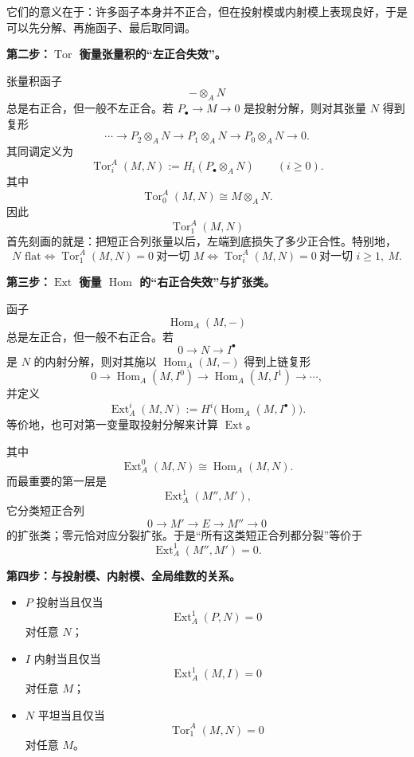 \documentclass[a4paper]{ctexart}
\theoremstyle{definition}
\theoremstyle{analysis}
\theoremstyle{plain}
\begin{document}
它们的意义在于：许多函子本身并不正合，但在投射模或内射模上表现良好，于是可以先分解、再施函子、最后取同调。

\medskip

\textbf{第二步：\(\operatorname{Tor}\) 衡量张量积的“左正合失效”。}

张量积函子
\[
  -\otimes_A N
\]
总是右正合，但一般不左正合。若 \(P_\bullet\to M\to 0\) 是投射分解，则对其张量 \(N\) 得到复形
\[
  \cdots \to P_2\otimes_A N\to P_1\otimes_A N\to P_0\otimes_A N\to 0.
\]
其同调定义为
\[
  \operatorname{Tor}_i^A(M,N):=H_i(P_\bullet\otimes_A N)\qquad (i\ge 0).
\]
其中
\[
  \operatorname{Tor}_0^A(M,N)\cong M\otimes_A N.
\]
因此
\[
  \operatorname{Tor}_1^A(M,N)
\]
首先刻画的就是：把短正合列张量以后，左端到底损失了多少正合性。特别地，
\[
  N \text{ flat}
  \iff
  \operatorname{Tor}_1^A(M,N)=0\ \text{对一切 }M
  \iff
  \operatorname{Tor}_i^A(M,N)=0\ \text{对一切 }i\ge 1,\ M.
\]

\medskip

\textbf{第三步：\(\operatorname{Ext}\) 衡量 \(\operatorname{Hom}\) 的“右正合失效”与扩张类。}

函子
\[
  \operatorname{Hom}_A(M,-)
\]
总是左正合，但一般不右正合。若
\[
  0\to N\to I^\bullet
\]
是 \(N\) 的内射分解，则对其施以 \(\operatorname{Hom}_A(M,-)\) 得到上链复形
\[
  0\to \operatorname{Hom}_A(M,I^0)\to \operatorname{Hom}_A(M,I^1)\to \cdots,
\]
并定义
\[
  \operatorname{Ext}_A^i(M,N):=H^i\!\bigl(\operatorname{Hom}_A(M,I^\bullet)\bigr).
\]
等价地，也可对第一变量取投射分解来计算 \(\operatorname{Ext}\)。

其中
\[
  \operatorname{Ext}_A^0(M,N)\cong \operatorname{Hom}_A(M,N).
\]
而最重要的第一层是
\[
  \operatorname{Ext}_A^1(M'',M'),
\]
它分类短正合列
\[
  0\to M'\to E\to M''\to 0
\]
的扩张类；零元恰对应分裂扩张。于是“所有这类短正合列都分裂”等价于
\[
  \operatorname{Ext}_A^1(M'',M')=0.
\]

\medskip

\textbf{第四步：与投射模、内射模、全局维数的关系。}

\begin{itemize}
  \item \(P\) 投射当且仅当
  \[
    \operatorname{Ext}_A^1(P,N)=0
  \]
  对任意 \(N\)；
  \item \(I\) 内射当且仅当
  \[
    \operatorname{Ext}_A^1(M,I)=0
  \]
  对任意 \(M\)；
  \item \(N\) 平坦当且仅当
  \[
    \operatorname{Tor}_1^A(M,N)=0
  \]
  对任意 \(M\)。
\end{itemize}
\end{document}
